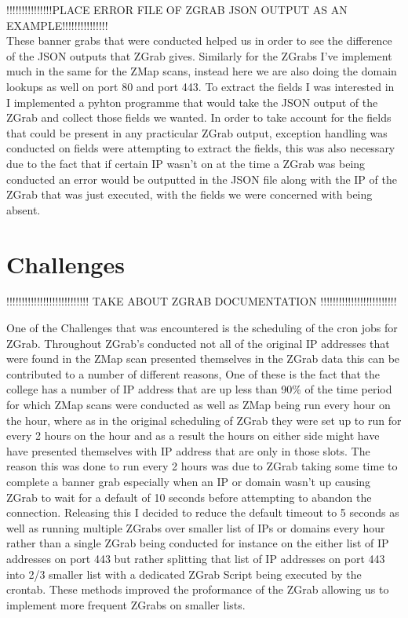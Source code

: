\documentclass[a4wide,leqno,12pt]{report}
\begin{document}
!!!!!!!!!!!!!!!PLACE ERROR FILE OF ZGRAB JSON OUTPUT AS AN EXAMPLE!!!!!!!!!!!!!!!\\

These banner grabs that were conducted helped us in order to see the difference of the JSON outputs that ZGrab gives. Similarly for the ZGrabs I've implement much in the same for the ZMap scans, instead here we are also doing the domain lookups as well on port 80 and port 443. To extract the fields I was interested in I implemented a pyhton programme that would take the JSON output of the ZGrab and collect those fields we wanted. In order to take account for the fields that could be present in any practicular ZGrab output, exception handling was conducted on fields were attempting to extract the fields, this was also necessary due to the fact that if certain IP wasn't on at the time a ZGrab was being conducted an error would be outputted in the JSON file along with the IP of the ZGrab that was just executed, with the fields we were concerned with being absent.
\section{Challenges}

!!!!!!!!!!!!!!!!!!!!!!!!!!! TAKE ABOUT ZGRAB DOCUMENTATION !!!!!!!!!!!!!!!!!!!!!!!!!


One of the Challenges that was encountered is the scheduling of the cron jobs for ZGrab. Throughout ZGrab's conducted not all of the original IP addresses that were found in the ZMap scan presented themselves in the ZGrab data this can be contributed to a number of different reasons, One of these is the fact that the college has a number of IP address that are up less than 90\% of the time period for which ZMap scans were conducted as well as ZMap being run every hour on the hour, where as in the original scheduling of ZGrab they were set up to run for every 2 hours on the hour and as a result the hours on either side might have have presented themselves with IP address that are only in those slots. The reason this was done to run every 2 hours was due to ZGrab taking some time to complete a banner grab especially when an IP or domain wasn't up causing ZGrab to wait for a default of 10 seconds before attempting to abandon the connection. Releasing this I decided to reduce the default timeout to 5 seconds as  well as running multiple ZGrabs over smaller list of IPs or domains every hour rather than a single ZGrab being conducted for instance on the either list of IP addresses on port 443 but rather splitting that list of IP addresses on port 443 into 2/3 smaller list with a dedicated ZGrab Script being executed by the crontab. These methods improved the proformance of the ZGrab allowing us to implement more frequent ZGrabs on smaller lists.
\end{document}
